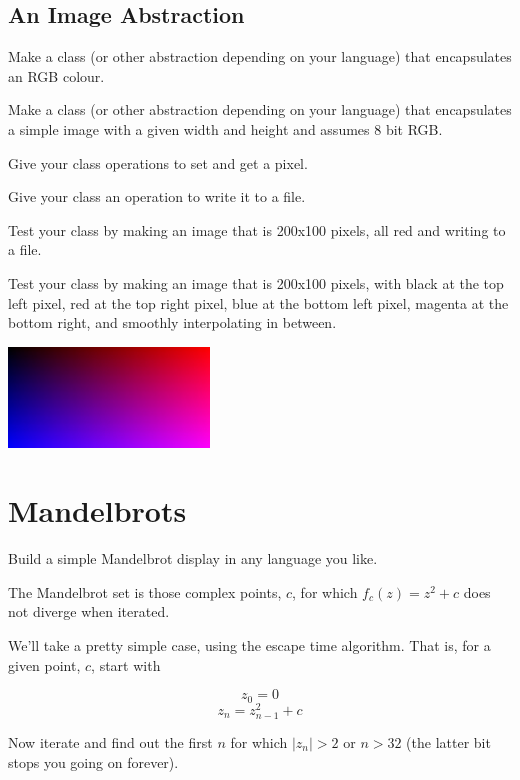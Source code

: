 \documentclass{article}
\begin{document}
        \subsection{An Image Abstraction}
            Make a class (or other abstraction depending on your language) that encapsulates an RGB colour.
        
            Make a class (or other abstraction depending on your language) that encapsulates a simple image with a given width and height 
            and assumes 8 bit RGB.
            
            Give your class operations to set and get a pixel.
            
            Give your class an operation to write it to a file.

            Test your class by making an image that is 200x100 pixels, all red and writing to a file. 

            Test your class by making an image that is 200x100 pixels, with black at the top left pixel, red at the top right pixel,
            blue at the bottom left pixel, magenta at the bottom right, and smoothly interpolating in between.
    
            \begin{center}
                \includegraphics[width=0.4\textwidth]{smooth}
            \end{center}
    
    \section{Mandelbrots}
        Build a simple Mandelbrot display in any language you like.
        
        The Mandelbrot set is those complex points, $c$, for which $f_c(z)=z^2+c$ does not diverge when iterated.
        
        We'll take a pretty simple case, using the escape time algorithm.  That is, for a given point, $c$, start with 
        
        $$z_0 = 0$$
        $$z_n = z_{n-1}^2 + c$$
        
        Now iterate and find out the first $n$ for which $|z_n| > 2$ or $n > 32$ (the latter bit stops you going on forever).  
        
\end{document}
